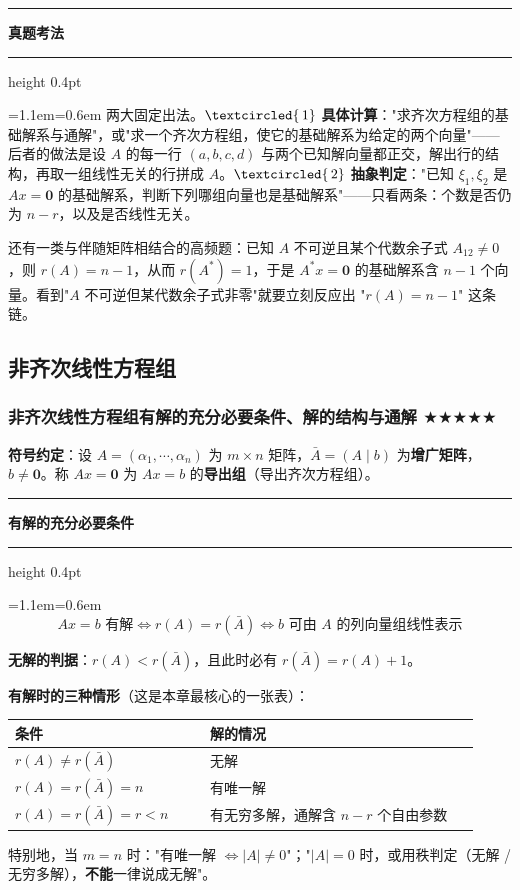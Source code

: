 \documentclass[11pt,openany,UTF8]{ctexbook}
\newcommand{\circled}[1]{\textcircled{\scriptsize\,#1}}
\newcommand{\callouthead}[2]{%
  \par\addvspace{7pt}\noindent
  {\color{#1}\rule[-0.15em]{3pt}{1.05em}}\hspace{0.5em}%
  {\bfseries\color{#1}#2}\par\nobreak\vspace{-0.35em}%
  {\color{rulesep}\hrule height 0.4pt}\nobreak\vspace{0.45em}%
  \begingroup\small\setlength{\parindent}{0pt}%
  \leftskip=1.1em\rightskip=0.6em\noindent\ignorespaces}
\newcommand{\calloutend}{\par\endgroup\addvspace{7pt}}
\newenvironment{callkey}[1]{\callouthead{keybar}{#1}}{\calloutend}
\newenvironment{callexam}[1]{\callouthead{exambar}{#1}}{\calloutend}
\begin{document}
\begin{callexam}{真题考法}
两大固定出法。$\circled{1}$ \textbf{具体计算}："求齐次方程组的基础解系与通解"，或"求一个齐次方程组，使它的基础解系为给定的两个向量"——后者的做法是设 $A$ 的每一行 $(a,b,c,d)$ 与两个已知解向量都正交，解出行的结构，再取一组线性无关的行拼成 $A$。$\circled{2}$ \textbf{抽象判定}："已知 $\xi_1,\xi_2$ 是 $Ax=\mathbf{0}$ 的基础解系，判断下列哪组向量也是基础解系"——只看两条：个数是否仍为 $n-r$，以及是否线性无关。

还有一类与伴随矩阵相结合的高频题：已知 $A$ 不可逆且某个代数余子式 $A_{12}\ne0$，则 $r(A)=n-1$，从而 $r(A^*)=1$，于是 $A^*x=\mathbf{0}$ 的基础解系含 $n-1$ 个向量。看到"$A$ 不可逆但某代数余子式非零"就要立刻反应出 "$r(A)=n-1$" 这条链。

\end{callexam}

\subsection{非齐次线性方程组}

\subsubsection{非齐次线性方程组有解的充分必要条件、解的结构与通解 $\bigstar$$\bigstar$$\bigstar$$\bigstar$$\bigstar$}

\textbf{符号约定}：设 $A=(\alpha_1,\cdots,\alpha_n)$ 为 $m\times n$ 矩阵，$\bar A=(A\mid b)$ 为\textbf{增广矩阵}，$b\ne\mathbf{0}$。称 $Ax=\mathbf{0}$ 为 $Ax=b$ 的\textbf{导出组}（导出齐次方程组）。

\begin{callkey}{有解的充分必要条件}
\[Ax=b\text{ 有解}\iff r(A)=r(\bar A)\iff b\text{ 可由 }A\text{ 的列向量组线性表示}\]

\textbf{无解的判据}：$r(A)<r(\bar A)$，且此时必有 $r(\bar A)=r(A)+1$。

\textbf{有解时的三种情形}（这是本章最核心的一张表）：

\begingroup\small\setlength{\tabcolsep}{4.0pt}
\begin{longtable}{@{}L{0.3960\linewidth}L{0.5496\linewidth}@{}}
\toprule
\textbf{条件} & \textbf{解的情况} \\
\midrule
\endhead
$r(A)\ne r(\bar A)$ & 无解 \\
$r(A)=r(\bar A)=n$ & 有唯一解 \\
$r(A)=r(\bar A)=r<n$ & 有无穷多解，通解含 $n-r$ 个自由参数 \\
\bottomrule
\end{longtable}
\endgroup

特别地，当 $m=n$ 时："有唯一解 $\iff\vert A\vert\ne0$"；"$\vert A\vert=0$ 时，或用秩判定（无解 / 无穷多解），\textbf{不能}一律说成无解"。

\end{callkey}
\end{document}
